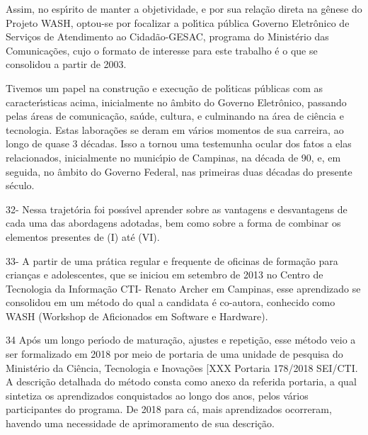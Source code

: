 \documentclass[
12pt,		%
openright,	%
twoside,  %
a4paper,			%
chapter=TITLE,		%
english,			%
french,				%
spanish,			%
brazil				%
]{USPSC-classe/USPSC_RedarTex}
\begin{document}
Assim, no esp\'{\i}rito de manter a objetividade, e por sua rela\c{c}\~ao direta na g\^enese do Projeto WASH, optou-se por focalizar a pol\'{\i}tica p\'ublica \textquotedbl Governo Eletr\^onico de Servi\c{c}os de Atendimento ao Cidad\~ao-GESAC, programa do  Minist\'erio das Comunica\c{c}\~oes, cujo o formato de interesse para este trabalho \'e o que se consolidou a partir de 2003.










Tivemos um papel na constru\c{c}\~ao e execu\c{c}\~ao de pol\'{\i}ticas p\'ublicas com as caracter\'{\i}sticas acima, inicialmente no \^ambito do Governo Eletr\^onico, passando pelas \'areas de comunica\c{c}\~ao, sa\'ude, cultura, e culminando na \'area de ci\^encia e tecnologia. Estas labora\c{c}\~oes  se deram em v\'arios momentos de sua carreira, ao longo de quase 3 d\'ecadas. Isso a tornou uma testemunha ocular dos fatos a elas relacionados, inicialmente no  munic\'{\i}pio de Campinas, na d\'ecada de 90, e, em seguida, no \^ambito do Governo Federal, nas primeiras duas d\'ecadas do presente s\'eculo.










32- Nessa trajet\'oria foi poss\'{\i}vel aprender sobre as vantagens e desvantagens de cada uma das abordagens adotadas, bem como sobre a forma de combinar os elementos presentes de (I) at\'e (VI).










33- A partir de uma pr\'atica regular e frequente de oficinas de forma\c{c}\~ao para  crian\c{c}as e adolescentes, que se iniciou em setembro de 2013 no Centro de Tecnologia da Informa\c{c}\~ao CTI- Renato Archer em Campinas, esse aprendizado se consolidou em um m\'etodo do qual a candidata \'e co-autora, conhecido como WASH (Workshop de Aficionados em Software e Hardware).










34 Ap\'os um longo per\'{\i}odo de matura\c{c}\~ao, ajustes e repeti\c{c}\~ao, esse m\'etodo veio a ser formalizado em 2018 por meio de portaria de uma unidade de pesquisa do Minist\'erio da Ci\^encia, Tecnologia e Inova\c{c}\~oes [XXX Portaria 178/2018 SEI/CTI. A descri\c{c}\~ao detalhada do m\'etodo consta como anexo da referida portaria, a qual sintetiza os aprendizados conquistados ao longo dos anos, pelos v\'arios participantes do programa. De 2018 para c\'a, mais aprendizados ocorreram, havendo uma necessidade de aprimoramento de sua descri\c{c}\~ao.
\end{document}
